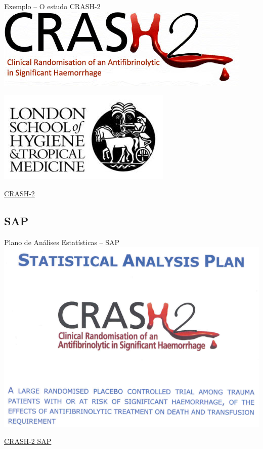 \documentclass{beamer}
\begin{document}
\begin{frame}{Exemplo -- O estudo CRASH-2}
  \centering
  \includegraphics[width=.8\textwidth]{Planejamento/C2logoNew}

  \bigskip
  \includegraphics[width=.4\textwidth]{Planejamento/Lshtm_newlogo}

  \vfill
  \scriptsize
  \hfill \href{http://www.crash2.lshtm.ac.uk/}{CRASH-2}
\end{frame}

\subsection{SAP}

\begin{frame}{Plano de Análises Estatísticas -- SAP}
  \centering
  \includegraphics[width=.9\textwidth]{Planejamento/CRASH-SAP}

  \vfill
  \scriptsize
  \hfill \href{http://www.crash2.lshtm.ac.uk/Images/SAP.pdf}{CRASH-2 SAP}
\end{frame}
\end{document}
